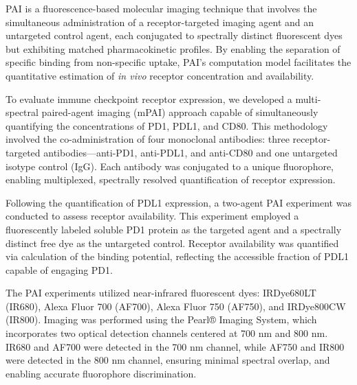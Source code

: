 PAI is a fluorescence-based molecular imaging technique that involves the simultaneous administration 
of a receptor-targeted imaging agent and an untargeted control agent, each conjugated to spectrally 
distinct fluorescent dyes but exhibiting matched pharmacokinetic profiles. By enabling the separation 
of specific binding from non-specific uptake, PAI's computation model facilitates the quantitative 
estimation of \textit{in vivo} receptor concentration and availability.

To evaluate immune checkpoint receptor expression, we developed a multi-spectral paired-agent 
imaging (mPAI) approach capable of simultaneously quantifying the concentrations of PD1, PDL1, and CD80. 
This methodology involved the co-administration of four monoclonal antibodies: three receptor-targeted 
antibodies—anti-PD1, anti-PDL1, and anti-CD80 and one untargeted isotype control (IgG). Each antibody 
was conjugated to a unique fluorophore, enabling multiplexed, spectrally resolved quantification of 
receptor expression.

Following the quantification of PDL1 expression, a two-agent PAI experiment was conducted to assess 
receptor availability. This experiment employed a fluorescently labeled soluble PD1 protein as the 
targeted agent and a spectrally distinct free dye as the untargeted control. Receptor availability 
was quantified via calculation of the binding potential, reflecting the accessible fraction of PDL1 
capable of engaging PD1.

The PAI experiments utilized near-infrared fluorescent dyes: IRDye680LT (IR680), Alexa Fluor 700 (AF700), 
Alexa Fluor 750 (AF750), and IRDye800CW (IR800). Imaging was performed using the Pearl® Imaging System, 
which incorporates two optical detection channels centered at 700 nm and 800 nm. IR680 and AF700 were 
detected in the 700 nm channel, while AF750 and IR800 were detected in the 800 nm channel, ensuring 
minimal spectral overlap, and enabling accurate fluorophore discrimination.

